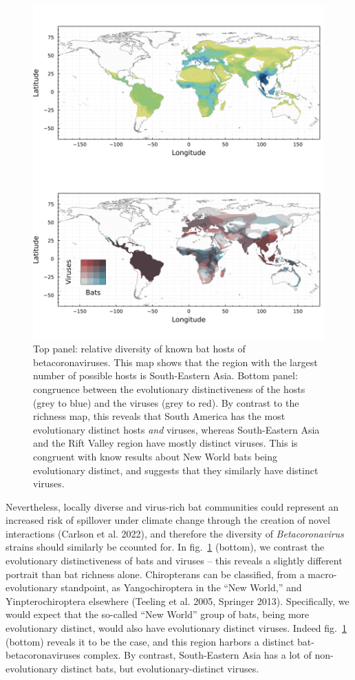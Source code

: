 \documentclass[11pt]{article}
\makeatletter
\def\maxwidth{\ifdim\Gin@nat@width>\linewidth\linewidth
\else\Gin@nat@width\fi}
\let\Oldincludegraphics\includegraphics
\renewcommand{\includegraphics}[1]{\Oldincludegraphics[width=\maxwidth]{#1}}
\makeatother
\begin{document}
\begin{figure}
\hypertarget{fig:richness}{%
\centering
\includegraphics{figures/combined_richness.png}
\caption{Top panel: relative diversity of known bat hosts of
betacoronaviruses. This map shows that the region with the largest
number of possible hosts is South-Eastern Asia. Bottom panel: congruence
between the evolutionary distinctiveness of the hosts (grey to blue) and
the viruses (grey to red). By contrast to the richness map, this reveals
that South America has the most evolutionary distinct hosts \emph{and}
viruses, whereas South-Eastern Asia and the Rift Valley region have
mostly distinct viruses. This is congruent with know results about New
World bats being evolutionary distinct, and suggests that they similarly
have distinct viruses.}\label{fig:richness}
}
\end{figure}

Nevertheless, locally diverse and virus-rich bat communities could
represent an increased risk of spillover under climate change through
the creation of novel interactions (Carlson et al. 2022), and therefore
the diversity of \emph{Betacoronavirus} strains should similarly be
ccounted for. In fig.~\ref{fig:richness} (bottom), we contrast the
evolutionary distinctiveness of bats and viruses -- this reveals a
slightly different portrait than bat richness alone. Chiropterans can be
classified, from a macro-evolutionary standpoint, as Yangochiroptera in
the ``New World,'' and Yinpterochiroptera elsewhere (Teeling et al.
2005, Springer 2013). Specifically, we would expect that the so-called
``New World'' group of bats, being more evolutionary distinct, would
also have evolutionary distinct viruses. Indeed fig.~\ref{fig:richness}
(bottom) reveals it to be the case, and this region harbors a distinct
bat-betacoronaviruses complex. By contrast, South-Eastern Asia has a lot
of non-evolutionary distinct bats, but evolutionary-distinct viruses.
\end{document}
